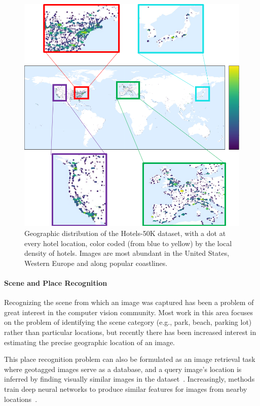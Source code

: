 \begin{figure}
    \centering
    \includegraphics[width=.95\columnwidth]{figures/chapter4/geographic_hist/geographic_density2.png}
    \caption{Geographic distribution of the Hotels-50K dataset, with a dot at every hotel location, color coded (from blue to yellow) by the local density of hotels. Images are most abundant in the United States, Western Europe and along popular coastlines. }
    \label{fig:geographicDensity}
\end{figure}

\paragraph{Scene and Place Recognition}
Recognizing the scene from which an image was captured has been a problem of great interest in the computer vision community. Most work in this area focuses on the problem of identifying the scene category (e.g., park, beach, parking lot) rather than particular locations, but recently there has been increased interest in estimating the precise geographic location of an image.

This place recognition problem can also be formulated as an image retrieval task where geotagged images serve as a database, and a query image's location is inferred by finding visually similar images in the dataset~\cite{baatz2012large,chen2011city,crandall2009mapping,hays2008im2gps,jacobs07geolocate,schindler2007city,torii2013visual,zamir2010accurate,googleLandmarks}. Increasingly, methods train deep neural networks to produce similar features for images from nearby locations~\cite{zhou2014recognizing,netvlad,visualPlaceRecognition,vo2017revisit,zhai2018geotemporal}.  

